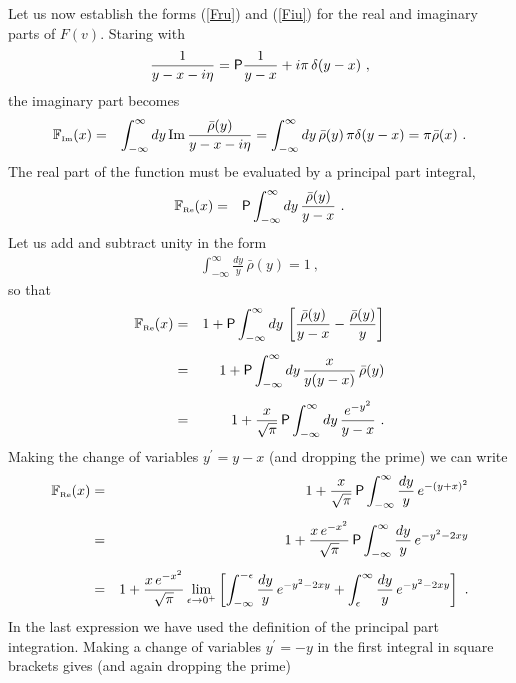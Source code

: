\documentclass[preprint,12pt,eqsecnum,nofootinbib,amsmath,amssymb]{revtex4}
\newcommand{\smRe}{{\rm\scriptscriptstyle Re}}
\newcommand{\smIm}{{\rm\scriptscriptstyle Im}}
\begin{document}
{{{{{{{Let us now establish the forms (\ref{Fru}) and (\ref{Fiu}) for the real
and imaginary parts of $F(v)$.  
Staring with
\begin{eqnarray}
  \frac{1}{y - x - i \eta} 
  =
  {\sf P}\frac{1}{y-x} + i \pi\,\delta(y-x) \ ,
\end{eqnarray}
the imaginary part becomes 
\begin{eqnarray}
  \mathbb{F}_\smIm(x) 
  &=& 
  \int_{-\infty}^\infty dy\, 
  {\rm Im}\,\frac{\bar\rho(y)}{y - x - i \eta} 
  =
  \int_{-\infty}^\infty dy\, \bar\rho(y) \,
  \pi \delta(y-x)
  =
  \pi \bar\rho(x) \ .
\end{eqnarray}
The real part of the function must be evaluated by a principal part
integral,
\begin{eqnarray}
  \mathbb{F}_\smRe(x) 
  &=& 
  {\sf P}\int_{-\infty}^\infty dy\, \frac{\bar\rho(y)}{y - x}  \ .
\end{eqnarray}
Let us add and subtract unity in the form
\begin{eqnarray}
  \int_{-\infty}^\infty \frac{dy}{y}\, \bar\rho(y) = 1 \ ,
\end{eqnarray}
so that
\begin{eqnarray}
  \mathbb{F}_\smRe(x) 
  &=& 
  1 +
  {\sf P}\int_{-\infty}^\infty dy\, 
  \left[\frac{\bar\rho(y)}{y - x} - \frac{\bar\rho(y)}{y}\right] 
\\[5pt]
  &=& 
  1 +
  {\sf P}\int_{-\infty}^\infty dy\, \frac{x}{y(y - x)}\, \bar\rho(y)
\\[5pt]
  &=& 
  1 +
  \frac{x}{\sqrt{\pi}}\,
  {\sf P}\int_{-\infty}^\infty dy\, \frac{e^{-y^2}}{y - x} \ .
\end{eqnarray}
Making the change of variables $y^\prime=y-x$ (and dropping the prime)
we can write 
\begin{eqnarray}
  \mathbb{F}_\smRe(x) 
  &=& 
  1 +
  \frac{x}{\sqrt{\pi}}\,
  {\sf P}\int_{-\infty}^\infty \frac{dy}{y}\, e^{-(y+x)^2} 
\\[5pt]
  &=&
  1 +
  \frac{x\,e^{-x^2}}{\sqrt{\pi}}\,
  {\sf P}\int_{-\infty}^\infty \frac{dy}{y}\, e^{-y^2 - 2 x y} 
\\[5pt]
  &=&
  1 +
  \frac{x\,e^{-x^2}}{\sqrt{\pi}}\lim_{\epsilon\to0^+}\left[
  \int_{-\infty}^{-\epsilon} \frac{dy}{y}\, e^{-y^2 - 2 x y} 
  +
  \int_\epsilon^\infty \frac{dy}{y}\, e^{-y^2 - 2 x y} 
  \right] \ .
\end{eqnarray}
In the last expression we have used the definition of the principal
part integration.  Making a change of variables $y^\prime=-y$ in the
first integral in square brackets gives (and again dropping the prime)
}}}}}}}
\end{document}
